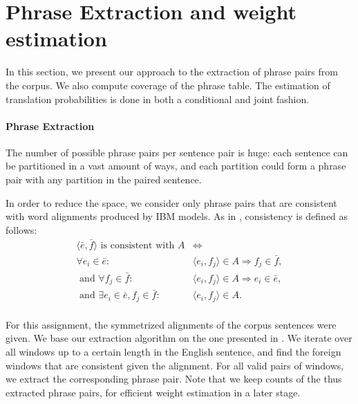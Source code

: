 \documentclass[11pt]{article}
\begin{document}
\section{Phrase Extraction and weight estimation}
\label{phraseExtraction}

In this section, we present our approach to the extraction of phrase pairs from the corpus. We also compute coverage of the phrase table. The estimation of translation probabilities is done in both a conditional and joint fashion.

\paragraph{Phrase Extraction}
The number of possible phrase pairs per sentence pair is huge: each sentence can be partitioned in a vast amount of ways, and each partition could form a phrase pair with any partition in the paired sentence. 

In order to reduce the space, we consider only phrase pairs that are consistent with word alignments produced by IBM models.
As in \cite{Koehn:2010}, consistency is defined as follows:
\begin{align*}
\langle \bar{e},\bar{f}\rangle\text{ is consistent with }A &\Leftrightarrow\\
\forall e_i\in \bar{e}: &\langle e_i,f_j\rangle \in A \Rightarrow f_j \in \bar{f}, \\
\text{ and }\forall f_j\in \bar{f}: &\langle e_i,f_j\rangle \in A \Rightarrow e_i \in \bar{e}, \\
\text{ and }\exists e_i \in \bar{e}, f_j\in \bar{f}: &\langle e_i,f_j\rangle \in A.\\
\end{align*}

For this assignment, the symmetrized alignments of the corpus sentences were given. 
We base our extraction algorithm on the one presented in \cite[page 133]{Koehn:2010}.
We iterate over all windows up to a certain length in the English sentence, and find the foreign windows that are consistent given the alignment. For all valid pairs of windows, we extract the corresponding phrase pair. Note that we keep counts of the thus extracted phrase pairs, for efficient weight estimation in a later stage.
\end{document}

